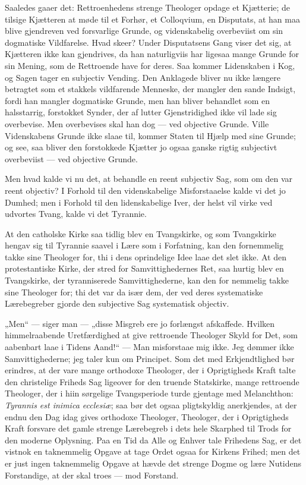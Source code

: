 \documentclass[12pt,a4paper]{book}
\newcommand{\opage}[1]{\marginnote{\footnotesize\textit{[#1]}}}
\begin{document}
Saaledes gaaer det: Rettroenhedens strenge Theologer opdage et Kjætterie; de
tilsige Kjætteren at møde til et Forhør, et Colloqvium, en Disputats, at han
maa blive gjendreven ved forsvarlige Grunde, og videnskabelig overbeviist om
sin dogmatiske Vildfarelse. Hvad skeer? Under Disputatsens Gang viser det sig,
at Kjætteren ikke kan gjendrives, da han naturligviis har ligesaa mange Grunde
for sin Mening, som de Rettroende have for deres. Saa kommer Lidenskaben i Kog,
og Sagen tager en subjectiv Vending. Den Anklagede bliver nu ikke længere
betragtet som et stakkels vildfarende Menneske, der mangler den sande Indsigt,
fordi han mangler dogmatiske Grunde, men han bliver behandlet som en
halsstarrig, forstokket Synder, der af lutter Gjenstridighed ikke vil lade sig
overbevise. Men overbevises skal han dog --- ved objective Grunde. Ville
Videnskabens Grunde ikke slaae til, kommer Staten til Hjælp med sine Grunde; og
see, saa bliver den forstokkede Kjætter jo ogsaa ganske rigtig subjectivt
overbeviist --- ved objective Grunde.

Men hvad kalde vi nu det, at behandle en reent subjectiv Sag, som om den var
reent objectiv? I Forhold til den videnskabelige Misforstaaelse kalde vi det jo
Dumhed; men i Forhold til den lidenskabelige Iver, der helst vil virke ved
udvortes Tvang, kalde vi det Tyrannie.

At den catholske Kirke saa tidlig blev en Tvangskirke, og som Tvangskirke
hengav sig til Tyrannie saavel i Lære som i Forfatning, kan den fornemmelig
takke sine Theologer for, thi i dens oprindelige Idee laae det slet ikke. At
den protestantiske Kirke, der stred for Samvittighedernes Ret, saa hurtig blev
en Tvangskirke, der tyranniserede Samvittighederne, kan den for\-%
\opage{120}nemmelig takke sine Theologer for; thi det var da især dem, der ved deres
systematiske Lærebegreber gjorde den subjective Sag systematisk objectiv.

„Men“ --- siger man --- „disse Misgreb ere jo forlængst afskaffede. Hvilken
himmelraabende Uretfærdighed at give rettroende Theologer Skyld for Det, som
aabenbart laae i Tidens Aand!“ --- Man misforstaae mig ikke. Jeg dømmer ikke
Samvittighederne; jeg taler kun om Principet. Som det med Erkjendtlighed bør
erindres, at der vare mange orthodoxe Theologer, der i Oprigtigheds Kraft talte
den christelige Friheds Sag ligeover for den truende Statskirke, mange
rettroende Theologer, der i hiin sørgelige Tvangsperiode turde gjentage med
Melanchthon: \textit{Tyrannis est inimica ecclesiæ}; saa bør det ogsaa
pligtskyldig anerkjendes, at der endnu den Dag idag gives orthodoxe Theologer,
Theologer, der i Oprigtigheds Kraft forsvare det gamle strenge Lærebegreb i
dets hele Skarphed til Trods for den moderne Oplysning. Paa en Tid da Alle og
Enhver tale Frihedens Sag, er det vistnok en taknemmelig Opgave at tage Ordet
ogsaa for Kirkens Frihed; men det er just ingen taknemmelig Opgave at hævde det
strenge Dogme og lære Nutidens Forstandige, at der skal troes --- mod Forstand.
\end{document}
